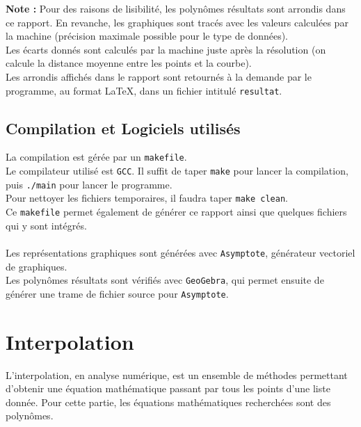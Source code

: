 \documentclass{report}
\begin{document}
      
      \newpage
      \textbf{Note :} Pour des raisons de lisibilité, les polynômes résultats sont arrondis dans ce rapport. En revanche, les graphiques sont tracés avec les valeurs calculées par la machine (précision maximale possible pour le type de données).\\
      Les écarts donnés sont calculés par la machine juste après la résolution (on calcule la distance moyenne entre les points et la courbe).\\
      Les arrondis affichés dans le rapport sont retournés à la demande par le programme, au format \LaTeX, dans un fichier intitulé \verb"resultat".
      
      
      
    \section{Compilation et Logiciels utilisés}
      \noindent La compilation est gérée par un \verb"makefile".\\
      Le compilateur utilisé est \verb"GCC".
      Il suffit de taper \verb"make" pour lancer la compilation, puis \verb"./main" pour lancer le programme.\\
      Pour nettoyer les fichiers temporaires, il faudra taper \verb"make clean".\\
      Ce \verb"makefile" permet également de générer ce rapport ainsi que quelques fichiers qui y sont intégrés.\\ \\
      Les représentations graphiques sont générées avec \verb"Asymptote", générateur vectoriel de graphiques.\\
      Les polynômes résultats sont vérifiés avec \verb"GeoGebra", qui permet ensuite de générer une trame de fichier source pour \verb"Asymptote".
  \chapter{Interpolation}
    \noindent L'interpolation, en analyse numérique, est un ensemble de méthodes permettant d'obtenir une équation mathématique passant par tous les points d'une liste donnée.
    \newline
    Pour cette partie, les équations mathématiques recherchées sont des polynômes.
    \newline
    
\end{document}
